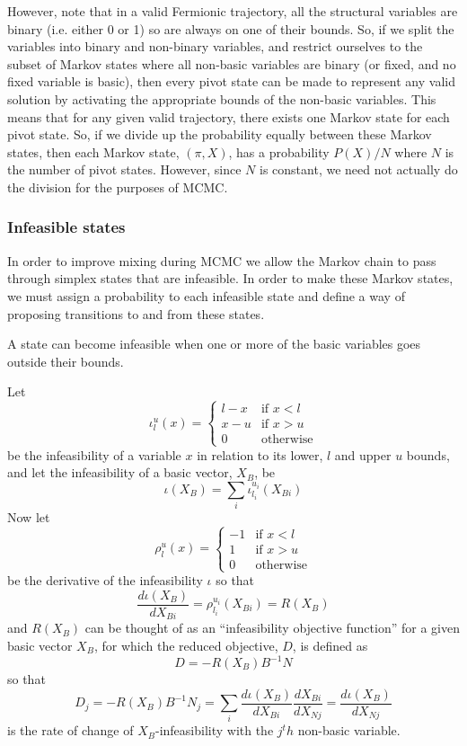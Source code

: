 \documentclass{article}
\begin{document}
However, note that in a valid Fermionic trajectory, all the structural variables are binary (i.e. either 0 or 1) so are always on one of their bounds. So, if we split the variables into binary and non-binary variables, and restrict ourselves to the subset of Markov states where all non-basic variables are binary (or fixed, and no fixed variable is basic), then every pivot state can be made to represent any valid solution by activating the appropriate bounds of the non-basic variables. This means that for any given valid trajectory, there exists one Markov state for each pivot state. So, if we divide up the probability equally between these Markov states, then each Markov state, $(\pi, X)$, has a probability $P(X)/N$ where $N$ is the number of pivot states. However, since $N$ is constant, we need not actually do the division for the purposes of MCMC.

\subsubsection{Infeasible states}

In order to improve mixing during MCMC we allow the Markov chain to pass through simplex states that are infeasible. In order to make these Markov states, we must assign a probability to each infeasible state and define a way of proposing transitions to and from these states.

A state can become infeasible when one or more of the basic variables goes outside their bounds.

Let 
\[
\iota^u_l(x) =
\begin{cases}
l-x & \text{if }x<l\\
x-u & \text{if }x>u\\
0 & \text{otherwise}
\end{cases}
\]
be the infeasibility of a variable $x$ in relation to its lower, $l$ and upper $u$ bounds, and let the infeasibility of a basic vector, $X_B$, be
\[
\iota(X_B) = \sum_i \iota^{u_i}_{l_i}(X_{Bi})
\]
Now let 
\[
\rho^u_l(x) =
\begin{cases}
-1 & \text{if }x<l\\
1 & \text{if }x>u\\
0 & \text{otherwise}
\end{cases}
\]
be the derivative of the infeasibility $\iota$ so that
\[
\frac{d\iota(X_B)}{dX_{Bi}} = \rho^{u_i}_{l_i}(X_{Bi}) = R(X_B)
\]
and $R(X_B)$ can be thought of as an ``infeasibility objective function'' for a given basic vector $X_B$, for which the reduced objective, $D$, is defined as
\[
D = -R(X_B)B^{-1}N
\]
so that
\[
D_j = -R(X_B)B^{-1}N_j = \sum_i \frac{d\iota(X_B)}{dX_{Bi}} \frac{dX_{Bi}}{dX_{Nj}} = \frac{d\iota(X_B)}{dX_{Nj}}
\]
is the rate of change of $X_B$-infeasibility with the $j^th$ non-basic variable.
\end{document}
